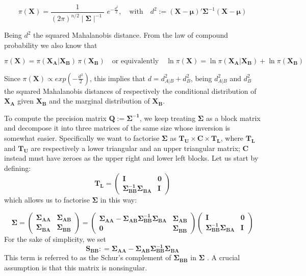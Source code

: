 \documentclass[openany]{book}
\begin{document}
$$ \pi(\mathbf{X}) = \frac{1}{(2 \pi)^{n/2} \mid \mathbf{\Sigma} \mid ^{-1}} \, \, e^{-\frac{d^2}{2}}, \quad \text{with} \quad  d^2 := (\mathbf{X} - \mathbf{\mu})' \mathbf{\Sigma}^{-1} (\mathbf{X} - \mathbf{\mu}) $$

Being $d^2$ the squared Mahalanobis distance. From the law of compound probability we also know that 
    
    $$\pi(\mathbf{X}) = \pi(\mathbf{X_A}|\mathbf{X_B}) \, \pi(\mathbf{X_B}) \quad \text{or equivalently} \quad \ln \pi(\mathbf{X}) = \ln \pi(\mathbf{X_A}|\mathbf{X_B}) + \ln \pi(\mathbf{X_B})$$ 


 Since $\pi(\mathbf{X}) \propto exp(-\tfrac{d^2}{2})$, this implies that $d = d^2_{A|B} + d^2_{B}$, being $d^2_{A|B}$ and $d^2_B$ the squared Mahalanobis distances of respectively the conditional distribution of $\mathbf{X_A}$ given $\mathbf{X_B}$ and the marginal distribution of $\mathbf{X_B}$.
  
 To compute the precision matrix $\mathbf{Q} := \mathbf{\Sigma^{-1}}$, we keep treating $\mathbf{\Sigma}$ as a block matrix and decompose it into three matrices of the same size whose inversion is somewhat easier. Specifically we want to factorise $\mathbf{\Sigma}$ as $\mathbf{T_U} \times \mathbf{C} \times \mathbf{T_L}$, where $\mathbf{T_L}$ and $\mathbf{T_U}$ are respectively a lower triangular and an upper triangular matrix; $\mathbf{C}$ instead must have zeroes as the upper right and lower left blocks. Let us start by defining:
 $$
  \mathbf{T_L} = \left( \begin{array}{ll} 
 	\mathbf{I} & \mathbf{0}\\ 
 	\mathbf{\Sigma_{BB}^{-1}} \mathbf{\Sigma_{BA}} & \mathbf{I}
 \end{array}
 \right)
$$ 
which allows us to factorise $\mathbf{\Sigma}$ in this way:

$$
\mathbf{\Sigma} = \left( \begin{array}{ll} \mathbf{\Sigma_{AA}} & \mathbf{\Sigma_{AB}}
	\\ \mathbf{\Sigma_{BA}} & \mathbf{\Sigma_{BB}}  \end{array}
\right) = 
\left( \begin{array}{ll} \mathbf{\mathbf{\Sigma_{AA}} - \mathbf{\Sigma_{AB}} \mathbf{\Sigma^{-1}_{BB}} \mathbf{\Sigma_{BA}}} & \mathbf{\Sigma_{AB}}
	\\ \mathbf{0} & \mathbf{\Sigma_{BB}}  \end{array}
\right)
\left( \begin{array}{ll} 
	\mathbf{I} & \mathbf{0}\\ 
	\mathbf{\Sigma_{BB}^{-1}} \mathbf{\Sigma_{BA}} & \mathbf{I}
\end{array}
\right)
$$
For the sake of simplicity, we set 
$$\mathbf{S_{BB}} : =
\mathbf{\Sigma_{AA}} - \mathbf{\Sigma_{AB}} \mathbf{\Sigma^{-1}_{BB}} \mathbf{\Sigma_{BA}}
$$
This term is referred to as the Schur's complement of $\mathbf{\Sigma_{BB}}$ in $\mathbf{\Sigma}$ \citep[][paragraph 0.7.3]{HornJohnson}. A crucial assumption is that this matrix is nonsingular.
\end{document}
